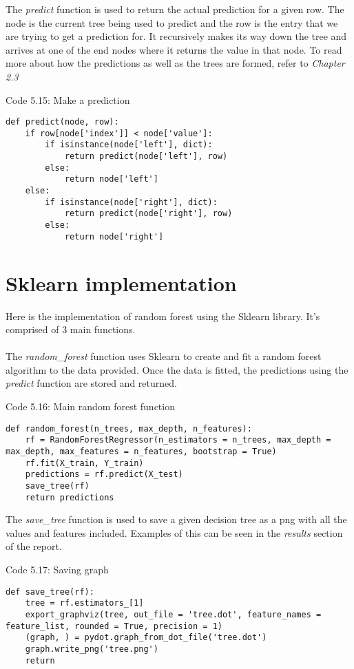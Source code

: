 The \textit{predict} function is used to return the actual prediction for a given row. The node is the current tree being used to predict and the row is the entry that we are trying to get a prediction for. It recursively makes its way down the tree and arrives at one of the end nodes where it returns the value in that node. To read more about how the predictions as well as the trees are formed, refer to \textit{Chapter 2.3}
\begin{center} 
Code 5.15: Make a prediction
\end{center}
\begin{lstlisting}
def predict(node, row):
    if row[node['index']] < node['value']:
        if isinstance(node['left'], dict):
            return predict(node['left'], row)
        else:
            return node['left']
    else:
        if isinstance(node['right'], dict):
            return predict(node['right'], row)
        else:
            return node['right']
\end{lstlisting}

\section{Sklearn implementation}
Here is the implementation of random forest using the Sklearn library. It's comprised of 3 main functions.
\\
\\
The \textit{random\_forest} function uses Sklearn to create and fit a random forest algorithm to the data provided. Once the data is fitted, the predictions using the \textit{predict} function are stored and returned.
\begin{center} 
Code 5.16: Main random forest function
\end{center}
\begin{lstlisting}
def random_forest(n_trees, max_depth, n_features):
    rf = RandomForestRegressor(n_estimators = n_trees, max_depth = max_depth, max_features = n_features, bootstrap = True)
    rf.fit(X_train, Y_train)
    predictions = rf.predict(X_test)
    save_tree(rf)
    return predictions
\end{lstlisting}

The \textit{save\_tree} function is used to save a given decision tree as a png with all the values and features included. Examples of this can be seen in the \textit{results} section of the report.
\begin{center} 
Code 5.17: Saving graph
\end{center}
\begin{lstlisting}
def save_tree(rf):
    tree = rf.estimators_[1]
    export_graphviz(tree, out_file = 'tree.dot', feature_names = feature_list, rounded = True, precision = 1)
    (graph, ) = pydot.graph_from_dot_file('tree.dot')
    graph.write_png('tree.png')
    return
\end{lstlisting}

